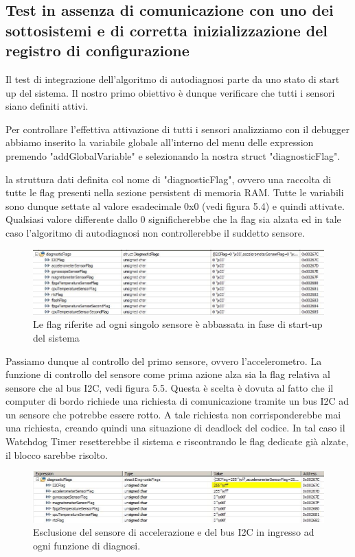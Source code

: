 \documentclass[LaM,binding=0.6cm]{../sapthesis}
\begin{document}
\subsection{Test in assenza di comunicazione con uno dei sottosistemi e di corretta inizializzazione
del registro di configurazione}
Il test di integrazione dell'algoritmo di autodiagnosi parte da uno stato di start up del sistema. Il nostro primo obiettivo è dunque verificare che tutti i sensori siano definiti attivi. 

Per controllare l'effettiva attivazione di tutti i sensori analizziamo con il debugger abbiamo inserito la variabile globale all'interno del menu delle expression premendo "addGlobalVariable" e selezionando la nostra struct "diagnosticFlag". 

la struttura dati definita col nome di "diagnosticFlag", ovvero una raccolta di tutte le flag presenti nella sezione persistent di memoria RAM. Tutte le variabili sono dunque settate al valore esadecimale 0x0 (vedi figura 5.4) e quindi attivate. Qualsiasi valore differente dallo 0 significherebbe che la flag sia alzata ed in tale caso l'algoritmo di autodiagnosi non controllerebbe il suddetto sensore.
\begin{figure}[htbp]
\centerline{\includegraphics[scale=0.6]{examples/1_diagnosticFlagStart.JPG}}
\caption{Le flag riferite ad ogni singolo sensore è abbassata in fase di start-up del sistema}
\label{fig}
\end{figure}
\vspace{0.5cm}
Passiamo dunque al controllo del primo sensore, ovvero l'accelerometro. La funzione di controllo del sensore come prima azione alza sia la flag relativa al sensore che al bus I2C, vedi figura 5.5. Questa è scelta è dovuta al fatto che il computer di bordo richiede una richiesta di comunicazione tramite un bus I2C ad un sensore che potrebbe essere rotto. A tale richiesta non corrisponderebbe mai una richiesta, creando quindi una situazione di deadlock del codice. 
In tal caso il Watchdog Timer resetterebbe il sistema e riscontrando le flag dedicate già alzate, il blocco sarebbe risolto.\newline
\begin{figure}[htbp]
\centerline{\includegraphics[scale=0.65]{examples/2_startAccelorometerCheck.JPG}}
\caption{Esclusione del sensore di accelerazione e del bus I2C in ingresso ad ogni funzione di diagnosi.}
\label{fig}
\end{figure}
\vspace{0.5cm}
\end{document}

